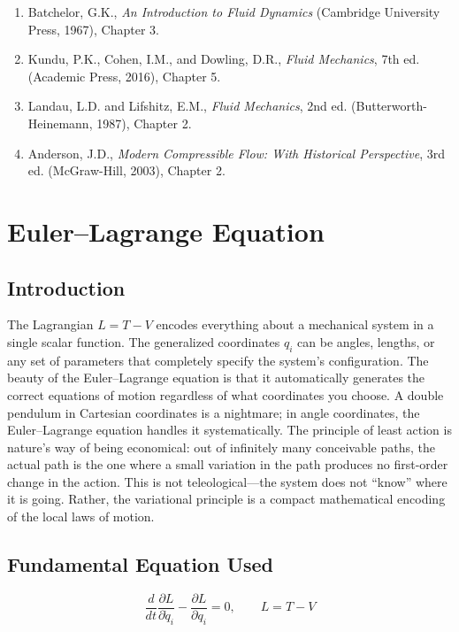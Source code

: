 \documentclass[11pt,openright]{book}
\begin{document}
\begin{enumerate}
\item Batchelor, G.K., \textit{An Introduction to Fluid Dynamics} (Cambridge University Press, 1967), Chapter 3.
\item Kundu, P.K., Cohen, I.M., and Dowling, D.R., \textit{Fluid Mechanics}, 7th ed. (Academic Press, 2016), Chapter 5.
\item Landau, L.D. and Lifshitz, E.M., \textit{Fluid Mechanics}, 2nd ed. (Butterworth-Heinemann, 1987), Chapter 2.
\item Anderson, J.D., \textit{Modern Compressible Flow: With Historical Perspective}, 3rd ed. (McGraw-Hill, 2003), Chapter 2.
\end{enumerate}


\chapter{Euler--Lagrange Equation}

\section*{Introduction}

The Lagrangian $L = T - V$ encodes everything about a mechanical system in a single scalar function. The generalized coordinates $q_i$ can be angles, lengths, or any set of parameters that completely specify the system's configuration. The beauty of the Euler--Lagrange equation is that it automatically generates the correct equations of motion regardless of what coordinates you choose. A double pendulum in Cartesian coordinates is a nightmare; in angle coordinates, the Euler--Lagrange equation handles it systematically. The principle of least action is nature's way of being economical: out of infinitely many conceivable paths, the actual path is the one where a small variation in the path produces no first-order change in the action. This is not teleological---the system does not ``know'' where it is going. Rather, the variational principle is a compact mathematical encoding of the local laws of motion.
\section*{Fundamental Equation Used}

\[
\frac{d}{dt}\frac{\partial L}{\partial \dot{q}_i}-\frac{\partial L}{\partial q_i}=0,\qquad L=T-V
\]
\end{document}
